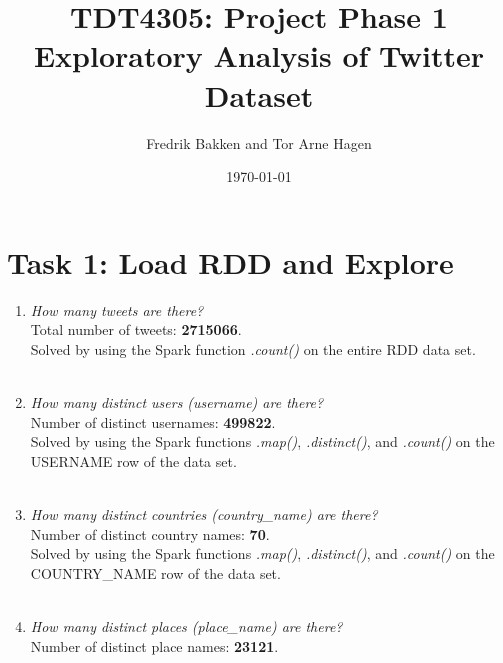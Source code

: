 \documentclass{article}
\title{TDT4305: Project Phase 1\\Exploratory Analysis of Twitter Dataset}
\author{Fredrik Bakken and Tor Arne Hagen}
\date{\today}
\begin{document}
\maketitle

\newpage

\section*{Task 1: Load RDD and Explore}
\begin{enumerate}[label=\alph*)]
    \item \textit{How many tweets are there?}\\
    
    Total number of tweets: \textbf{2715066}.\\
    
    Solved by using the Spark function \textit{.count()} on the entire RDD data set.\\ \\
    
    
    \item \textit{How many distinct users (username) are there?}\\
    
    Number of distinct usernames: \textbf{499822}.\\
    
    Solved by using the Spark functions \textit{.map()}, \textit{.distinct()}, and \textit{.count()} on the USERNAME row of the data set.\\ \\
    
    
    \item \textit{How many distinct countries (country\_name) are there?}\\
    
    Number of distinct country names: \textbf{70}.\\
    
    Solved by using the Spark functions \textit{.map()}, \textit{.distinct()}, and \textit{.count()} on the COUNTRY\_NAME row of the data set.\\ \\
    
    
    \item \textit{How many distinct places (place\_name) are there?}\\
    
    Number of distinct place names: \textbf{23121}.\\
    

\end{enumerate}
\end{document}

